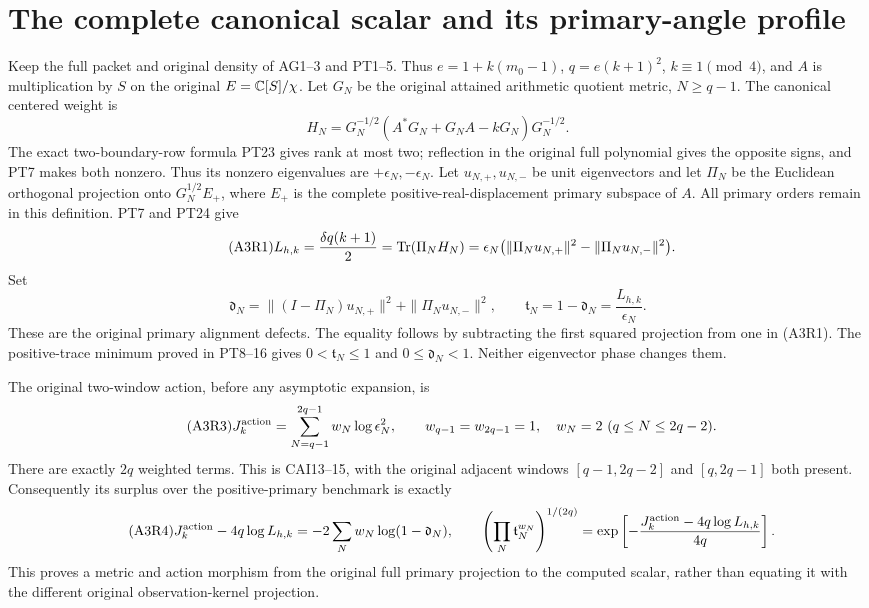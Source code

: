 \section{The complete canonical scalar and its primary-angle profile}
Keep the full packet and original density of AG1--3 and PT1--5.
Thus $e=1+k(m_0-1)$, $q=e(k+1)^2$, $k\equiv1\pmod4$,
and $A$ is multiplication by $S$ on the original $E=\mathbb C[S]/\chi$.
Let $G_N$ be the original attained arithmetic quotient metric, $N\ge q-1$.
The canonical centered weight is
\[
 H_N=G_N^{-1/2}(A^*G_N+G_NA-kG_N)G_N^{-1/2}.
\]
The exact two-boundary-row formula PT23 gives rank at most two;
reflection in the original full polynomial gives the opposite signs,
and PT7 makes both nonzero. Thus its nonzero eigenvalues are
$+\epsilon_N,-\epsilon_N$. Let $u_{N,+},u_{N,-}$ be
unit eigenvectors and let $\Pi_N$ be the Euclidean orthogonal projection onto
$G_N^{1/2}E_+$, where $E_+$ is the complete positive-real-displacement
primary subspace of $A$. All primary orders remain in this definition.
PT7 and PT24 give
\begin{equation}\tag{A3R1}
 L_{h,k}=\frac{\delta q(k+1)}2
 =\operatorname{Tr}(\Pi_NH_N)
 =\epsilon_N\bigl(\|\Pi_Nu_{N,+}\|^2-\|\Pi_Nu_{N,-}\|^2\bigr).
\end{equation}
Set
\begin{equation}\tag{A3R2}
 \mathfrak d_N=\|(I-\Pi_N)u_{N,+}\|^2+\|\Pi_Nu_{N,-}\|^2,
 \qquad \mathfrak t_N=1-\mathfrak d_N=\frac{L_{h,k}}{\epsilon_N}.
\end{equation}
These are the original primary alignment defects. The equality follows
by subtracting the first squared projection from one in (A3R1).
The positive-trace minimum proved in PT8--16 gives
$0<\mathfrak t_N\le1$ and $0\le \mathfrak d_N<1$. Neither eigenvector phase changes them.

The original two-window action, before any asymptotic expansion, is
\begin{equation}\tag{A3R3}
 J_k^{\rm action}=\sum_{N=q-1}^{2q-1}w_N\log\epsilon_N^2,
 \qquad w_{q-1}=w_{2q-1}=1,\quad w_N=2\ (q\le N\le2q-2).
\end{equation}
There are exactly $2q$ weighted terms. This is CAI13--15, with the
original adjacent windows $[q-1,2q-2]$ and $[q,2q-1]$ both present.
Consequently its surplus over the positive-primary benchmark is exactly
\begin{equation}\tag{A3R4}
 J_k^{\rm action}-4q\log L_{h,k}
 =-2\sum_Nw_N\log(1-\mathfrak d_N),\qquad
 \left(\prod_N\mathfrak t_N^{w_N}\right)^{1/(2q)}
 =\exp\left[-\frac{J_k^{\rm action}-4q\log L_{h,k}}{4q}\right].
\end{equation}
This proves a metric and action morphism from the original full primary
projection to the computed scalar, rather than equating it with the
different original observation-kernel projection.


